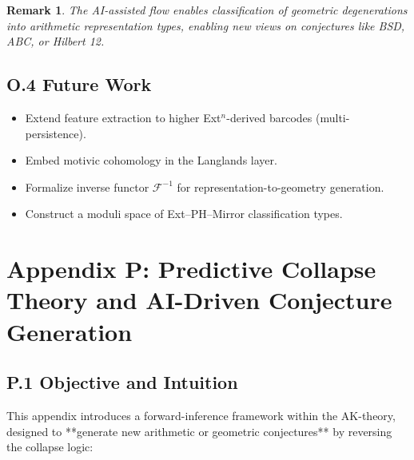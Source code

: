 \documentclass[11pt]{article}
\newtheorem{remark}[theorem]{Remark}
\begin{document}
\vspace{1em}
\begin{center}
\end{center}
\vspace{1em}

\begin{remark}
The AI-assisted flow enables classification of geometric degenerations into arithmetic representation types, enabling new views on conjectures like BSD, ABC, or Hilbert 12.
\end{remark}

\subsection*{O.4 Future Work}

\begin{itemize}
  \item Extend feature extraction to higher Ext$^n$-derived barcodes (multi-persistence).
  \item Embed motivic cohomology in the Langlands layer.
  \item Formalize inverse functor \( \mathcal{F}^{-1} \) for representation-to-geometry generation.
  \item Construct a moduli space of Ext–PH–Mirror classification types.
\end{itemize}


\section*{Appendix P: Predictive Collapse Theory and AI-Driven Conjecture Generation}

\subsection*{P.1 Objective and Intuition}

This appendix introduces a forward-inference framework within the AK-theory,  
designed to **generate new arithmetic or geometric conjectures** by reversing the collapse logic:
\end{document}
